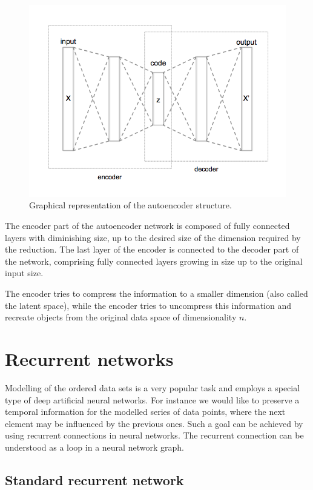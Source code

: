 \begin{figure}
  \centering
  \includegraphics[width=0.6\linewidth]{figures/chapter3/Autoencoder_structure.png}
  \caption[autoenc]{Graphical representation of the autoencoder structure\footnotemark. }
  \label{fig:autoenc}
\end{figure}


The encoder part of the autoencoder network is composed of fully connected layers with diminishing size, up to the desired size of the dimension required by the reduction.
The last layer of the encoder is connected to the decoder part of the network, comprising fully connected layers growing in size up to the original input size.

The encoder tries to compress the information to a smaller dimension (also called the latent space), while the encoder tries to uncompress this information and recreate objects from the original data space of dimensionality $n$.


\section{Recurrent networks}

Modelling of the ordered data sets is a very popular task and employs a special type of deep artificial neural networks. For instance we would like to preserve a temporal information for the modelled series of data points, where the next element may be influenced by the previous ones.
Such a goal can be achieved by using recurrent connections in neural networks.
The recurrent connection can be understood as a loop in a neural network graph.

\subsection{Standard recurrent network}

